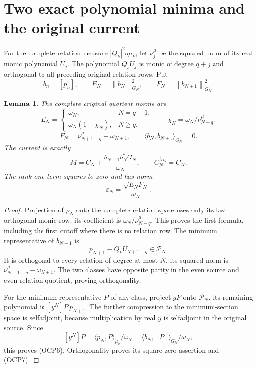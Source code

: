 \documentclass[11pt]{article}
\newtheorem{lemma}[theorem]{Lemma}
\newcommand{\Pp}{\mathcal P}
\newcommand{\eps}{\varepsilon}
\newcommand{\norm}[1]{\left\lVert#1\right\rVert}
\begin{document}
\section{Two exact polynomial minima and the original current}
For the complete relation measure $|Q_k|^2d\mu_k$, let $\nu_j^\mu$ be the squared norm of its real monic polynomial $U_j$. The polynomial $Q_kU_j$ is monic of degree $q+j$ and orthogonal to all preceding original relation rows. Put
\[
 b_n=[p_n],\qquad E_N=\norm{b_N}_{G_N}^2,\qquad
 F_N=\norm{b_{N+1}}_{G_N}^2.
\]
\begin{lemma}
The complete original quotient norms are
\[
 E_N=\begin{cases}\omega_N,&N=q-1,\\
 \omega_N(1-\chi_N),&N\ge q,\end{cases}
 \qquad \chi_N=\omega_N/\nu_{N-q}^\mu,
\]
\[
 F_N=\nu_{N+1-q}^\mu-\omega_{N+1},\qquad
 \langle b_N,b_{N+1}\rangle_{G_N}=0.
 \tag{OCP5}
\]
The current is exactly
\[
 M=C_N+\frac{b_{N+1}b_N^*G_N}{\omega_N},\qquad
 C_N^{\dagger_{G_N}}=C_N.
 \tag{OCP6}
\]
The rank-one term squares to zero and has norm
\[
 \eps_N=\frac{\sqrt{E_NF_N}}{\omega_N}.
 \tag{OCP7}
\]
\end{lemma}
\begin{proof}
Projection of $p_N$ onto the complete relation space uses only its last orthogonal monic row: its coefficient is $\omega_N/\nu_{N-q}^\mu$. This proves the first formula, including the first cutoff where there is no relation row. The minimum representative of $b_{N+1}$ is
\[
 p_{N+1}-Q_kU_{N+1-q}\in\Pp_N.
\]
It is orthogonal to every relation of degree at most $N$. Its squared norm is $\nu_{N+1-q}^\mu-\omega_{N+1}$. The two classes have opposite parity in the even source and even relation quotient, proving orthogonality.

For the minimum representative $P$ of any class, project $yP$ onto $\Pp_N$. Its remaining polynomial is $[y^N]P\,p_{N+1}$. The further compression to the minimum-section space is selfadjoint, because multiplication by real $y$ is selfadjoint in the original source. Since
\[
 [y^N]P=\langle p_N,P\rangle_{\mu_k}/\omega_N
 =\langle b_N,[P]\rangle_{G_N}/\omega_N,
\]
this proves (OCP6). Orthogonality proves its square-zero assertion and (OCP7).
\end{proof}
\end{document}
